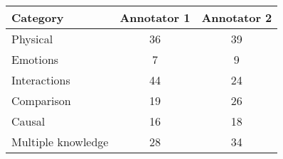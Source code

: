 
\begin{tabular}{  l | c | c  }
    \hline
    \textbf{Category}  & \textbf{Annotator 1}  & \textbf{Annotator 2} \\ \hline
    Physical & 36 & 39 \\\hline
    Emotions & 7 & 9 \\\hline
    Interactions & 44 & 24 \\\hline
    Comparison & 19 & 26 \\\hline
    Causal & 16 & 18 \\\hline
    Multiple knowledge & 28 & 34\\\hline
\end{tabular}


